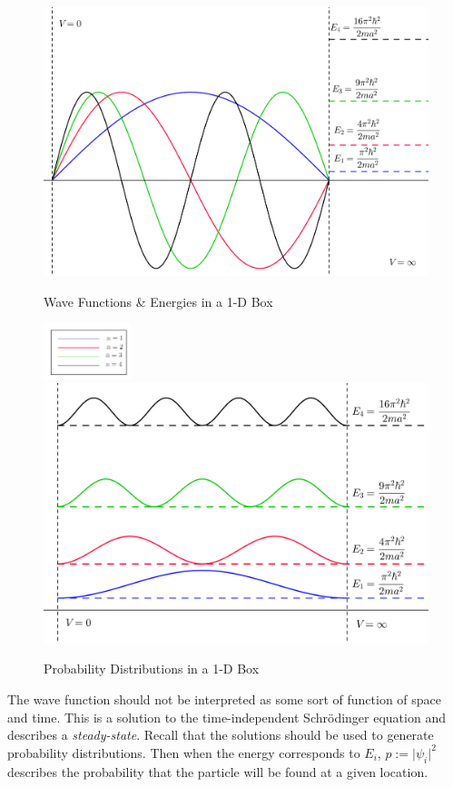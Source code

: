 \documentclass[12pt,]{book}
\begin{document}
\begin{figure}[h]
\includegraphics[width=\textwidth]{graphics/1dbox-geo.png}
\caption{Wave Functions \& Energies in a 1-D Box}
\endminipage\hfill
{}
\centering
\includegraphics[width=1in]{graphics/n.png}
\endminipage\hfill
{}
\includegraphics[width=\textwidth]{graphics/1dbox-prob.png}
\caption{Probability Distributions in a 1-D Box}
\endminipage\hfill
\end{figure}

The wave function should not be interpreted as some sort of function of
space and time. This is a solution to the time-independent Schrödinger
equation and describes a \emph{steady-state}. Recall that the solutions
should be used to generate probability distributions. Then when the
energy corresponds to \(E_i\), \(p:=\rvert\psi_i\rvert^2\) describes the
probability that the particle will be found at a given location.
\end{document}
